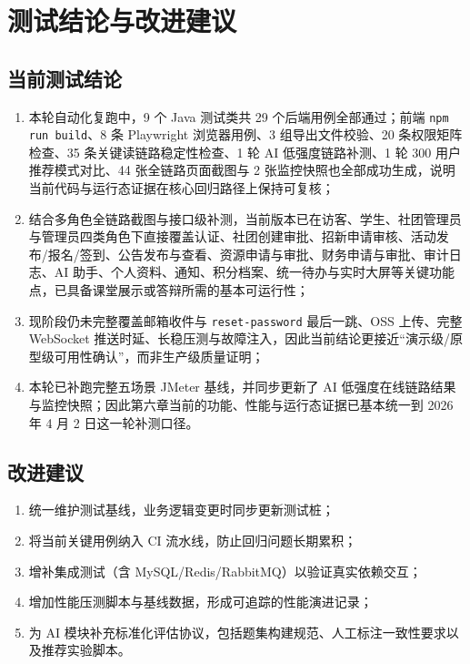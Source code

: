 \section{测试结论与改进建议}

\subsection{当前测试结论}

\begin{enumerate}
  \item 本轮自动化复跑中，9 个 Java 测试类共 29 个后端用例全部通过；前端 \texttt{npm run build}、8 条 Playwright 浏览器用例、3 组导出文件校验、20 条权限矩阵检查、35 条关键读链路稳定性检查、1 轮 AI 低强度链路补测、1 轮 300 用户推荐模式对比、44 张全链路页面截图与 2 张监控快照也全部成功生成，说明当前代码与运行态证据在核心回归路径上保持可复核；
  \item 结合多角色全链路截图与接口级补测，当前版本已在访客、学生、社团管理员与管理员四类角色下直接覆盖认证、社团创建审批、招新申请审核、活动发布/报名/签到、公告发布与查看、资源申请与审批、财务申请与审批、审计日志、AI 助手、个人资料、通知、积分档案、统一待办与实时大屏等关键功能点，已具备课堂展示或答辩所需的基本可运行性；
  \item 现阶段仍未完整覆盖邮箱收件与 \texttt{reset-password} 最后一跳、OSS 上传、完整 WebSocket 推送时延、长稳压测与故障注入，因此当前结论更接近“演示级/原型级可用性确认”，而非生产级质量证明；
  \item 本轮已补跑完整五场景 JMeter 基线，并同步更新了 AI 低强度在线链路结果与监控快照；因此第六章当前的功能、性能与运行态证据已基本统一到 2026 年 4 月 2 日这一轮补测口径。
\end{enumerate}

\subsection{改进建议}

\begin{enumerate}
  \item 统一维护测试基线，业务逻辑变更时同步更新测试桩；
  \item 将当前关键用例纳入 CI 流水线，防止回归问题长期累积；
  \item 增补集成测试（含 MySQL/Redis/RabbitMQ）以验证真实依赖交互；
  \item 增加性能压测脚本与基线数据，形成可追踪的性能演进记录；
  \item 为 AI 模块补充标准化评估协议，包括题集构建规范、人工标注一致性要求以及推荐实验脚本。
\end{enumerate}
\fussy
\hfuzz=0.1pt



